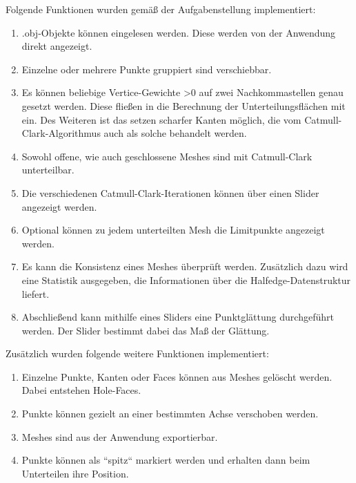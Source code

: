 Folgende Funktionen wurden gemä\ss{} der Aufgabenstellung implementiert:
\begin{enumerate}
\item .obj-Objekte können eingelesen werden. Diese werden von der Anwendung direkt angezeigt.
\item Einzelne oder mehrere Punkte gruppiert sind verschiebbar. 
\item Es können beliebige Vertice-Gewichte >0 auf zwei Nachkommastellen genau gesetzt werden. Diese flie\ss{}en in die Berechnung der Unterteilungsflächen mit ein. 
Des Weiteren ist das setzen scharfer Kanten möglich, die vom Catmull-Clark-Algorithmus auch als solche behandelt werden.
\item Sowohl offene, wie auch geschlossene Meshes sind mit Catmull-Clark unterteilbar. 
\item Die verschiedenen Catmull-Clark-Iterationen können über einen Slider angezeigt werden. 
\item Optional können zu jedem unterteilten Mesh die Limitpunkte angezeigt werden.
\item Es kann die Konsistenz eines Meshes überprüft werden. Zusätzlich dazu wird eine Statistik ausgegeben, die Informationen über die Halfedge-Datenstruktur liefert. 
\item Abschließend kann mithilfe eines Sliders eine Punktglättung durchgeführt werden. Der Slider bestimmt dabei das Maß der Glättung.
\end{enumerate}

Zusätzlich wurden folgende weitere Funktionen implementiert:
\begin{enumerate}
\item Einzelne Punkte, Kanten oder Faces können aus Meshes gelöscht werden. Dabei entstehen Hole-Faces.
\item Punkte können gezielt an einer bestimmten Achse verschoben werden.
\item Meshes sind aus der Anwendung exportierbar.
\item Punkte können als ``spitz`` markiert werden und erhalten dann beim Unterteilen ihre Position.
\end{enumerate}